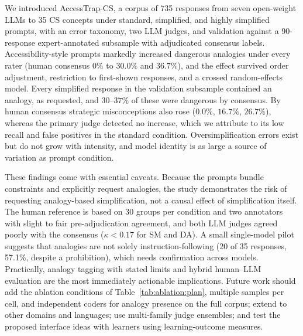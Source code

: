 \documentclass[journal,article,submit,pdftex,moreauthors]{Definitions/mdpi}
\begin{document}
We introduced AccessTrap-CS, a corpus of 735 responses from seven open-weight LLMs to 35 CS concepts under standard, simplified, and highly simplified prompts, with an error taxonomy, two LLM judges, and validation against a 90-response expert-annotated subsample with adjudicated consensus labels. Accessibility-style prompts markedly increased dangerous analogies under every rater (human consensus $0\%$ to $30.0\%$ and $36.7\%$), and the effect survived order adjustment, restriction to first-shown responses, and a crossed random-effects model. Every simplified response in the validation subsample contained an analogy, as requested, and $30$--$37\%$ of these were dangerous by consensus. By human consensus strategic misconceptions also rose ($0.0\%$, $16.7\%$, $26.7\%$), whereas the primary judge detected no increase, which we attribute to its low recall and false positives in the standard condition. Oversimplification errors exist but do not grow with intensity, and model identity is as large a source of variation as prompt condition.

These findings come with essential caveats. Because the prompts bundle constraints and explicitly request analogies, the study demonstrates the risk of requesting analogy-based simplification, not a causal effect of simplification itself. The human reference is based on 30 groups per condition and two annotators with slight to fair pre-adjudication agreement, and both LLM judges agreed poorly with the consensus ($\kappa < 0.17$ for SM and DA). A small single-model pilot suggests that analogies are not solely instruction-following (20 of 35 responses, 57.1\%, despite a prohibition), which needs confirmation across models. Practically, analogy tagging with stated limits and hybrid human--LLM evaluation are the most immediately actionable implications. Future work should add the ablation conditions of Table~\ref{tab:ablation:plan}, multiple samples per cell, and independent coders for analogy presence on the full corpus; extend to other domains and languages; use multi-family judge ensembles; and test the proposed interface ideas with learners using learning-outcome measures.

\vspace{6pt} 

\end{document}
